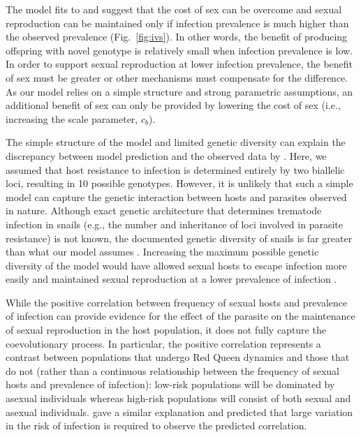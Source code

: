 \documentclass{article}\usepackage[]{graphicx}\usepackage[]{color}
\newcommand{\fref}[1]{Fig.~\ref{fig:#1}}
\begin{document}
The model fits to \cite{dagan2013clonal} and \cite{mckone2016fine} suggest that the cost of sex can be overcome and sexual reproduction can be maintained only if infection prevalence is much higher than the observed prevalence (\fref{ivs}).
In other words, the benefit of producing offspring with novel genotype is relatively small when infection prevalence is low.
In order to support sexual reproduction at lower infection prevalence, the benefit of sex must be greater or other mechanisms must compensate for the difference.
As our model relies on a simple structure and strong parametric assumptions, an additional benefit of sex can only be provided by lowering the cost of sex (i.e., increasing the scale parameter, $c_b$).

The simple structure of the model and limited genetic diversity can explain the discrepancy between model prediction and the observed data by \cite{mckone2016fine}.
Here, we assumed that host resistance to infection is determined entirely by two biallelic loci, resulting in 10 possible genotypes.
However, it is unlikely that such a simple model can capture the genetic interaction between hosts and parasites observed in nature.
Although exact genetic architecture that determines trematode infection in snails (e.g., the number and inheritance of loci involved in parasite resistance) is not known, the documented genetic diversity of snails is far greater than what our model assumes \citep{fox1996genetic, king2011parasites, dagan2013clonal}.
Increasing the maximum possible genetic diversity of the model would have allowed sexual hosts to escape infection more easily and maintained sexual reproduction at a lower prevalence of infection \citep{lively2010effect, king2012does, ashby2015diversity}.

While the positive correlation between frequency of sexual hosts and prevalence of infection can provide evidence for the effect of the parasite on the maintenance of sexual reproduction in the host population, it does not fully capture the coevolutionary process.
In particular, the positive correlation represents a contrast between populations that undergo Red Queen dynamics and those that do not (rather than a continuous relationship between the frequency of sexual hosts and prevalence of infection):
low-risk populations will be dominated by asexual individuals whereas high-risk populations will consist of both sexual and asexual individuals.
\cite{lively2001trematode} gave a similar explanation and predicted that large variation in the risk of infection is required to observe the predicted correlation.
\end{document}
